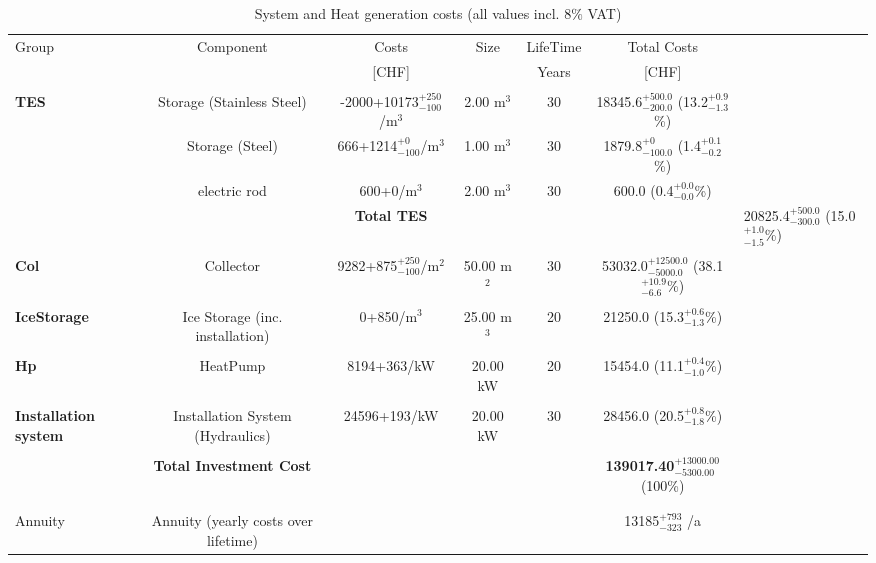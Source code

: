 \documentclass[english]{SPFShortReport}
\begin{document}
\begin{table}[!ht]
\centering
\caption{System and Heat generation costs (all values incl. 8$\%$ VAT) }
\begin{adjustbox}{max width =\textwidth}
\begin{tabular}{l | c c c c c } 
\hline
\hline
Group &Component &Costs &Size &LifeTime &Total Costs \\ 
 & &[CHF] & &Years &[CHF]\\ 
\hline
\\
\textbf{TES} & Storage (Stainless Steel) & -2000+10173$^{\mathrm{+250}}_{\mathrm{-100}}$/m$^3$ & 2.00 m$^3$ & 30 & 18345.6$^{\mathrm{+500.0}}_{\mathrm{-200.0}}$ (13.2$^{\mathrm{+0.9}}_{\mathrm{-1.3}}$\%) \\
 & Storage (Steel) & 666+1214$^{\mathrm{+0}}_{\mathrm{-100}}$/m$^3$ & 1.00 m$^3$ & 30 & 1879.8$^{\mathrm{+0}}_{\mathrm{-100.0}}$ (1.4$^{\mathrm{+0.1}}_{\mathrm{-0.2}}$\%) \\
 & electric rod & 600+0/m$^3$ & 2.00 m$^3$ & 30 & 600.0 (0.4$^{\mathrm{+0.0}}_{\mathrm{-0.0}}$\%) \\
&
 & \textbf{Total TES} & & & & 20825.4$^{\mathrm{+500.0}}_{\mathrm{-300.0}}$ (15.0$^{\mathrm{+1.0}}_{\mathrm{-1.5}}$\%) \\
\hline \\
\textbf{Col} & Collector & 9282+875$^{\mathrm{+250}}_{\mathrm{-100}}$/m$^2$ & 50.00 m$^2$ & 30 & 53032.0$^{\mathrm{+12500.0}}_{\mathrm{-5000.0}}$ (38.1$^{\mathrm{+10.9}}_{\mathrm{-6.6}}$\%) \\
\hline \\
\textbf{IceStorage} & Ice Storage (inc. installation) & 0+850/m$^3$ & 25.00 m$^3$ & 20 & 21250.0 (15.3$^{\mathrm{+0.6}}_{\mathrm{-1.3}}$\%) \\
\hline \\
\textbf{Hp} & HeatPump & 8194+363/kW & 20.00 kW & 20 & 15454.0 (11.1$^{\mathrm{+0.4}}_{\mathrm{-1.0}}$\%) \\
\hline \\
\textbf{Installation system} & Installation System (Hydraulics) & 24596+193/kW & 20.00 kW & 30 & 28456.0 (20.5$^{\mathrm{+0.8}}_{\mathrm{-1.8}}$\%) \\
\hline \\
 & \textbf{Total Investment Cost} & & & & \textbf{139017.40$^{\mathrm{+13000.00}}_{\mathrm{-5300.00}}$} (100\%) \\ 
\hline \\ 
\hline \\ 
Annuity & Annuity (yearly costs over lifetime)  &&& & 13185$^{\mathrm{+793}}_{\mathrm{-323}}$ /a  \\

\end{tabular}
\end{adjustbox}
\end{table}
\end{document}
